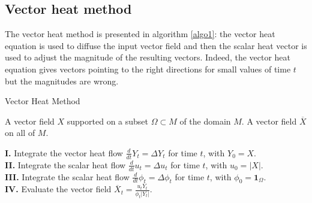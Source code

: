 \documentclass[sigconf]{acmart}
\begin{document}
\subsection{Vector heat method}
The vector heat method \cite{sharp_vector_2019} is presented in algorithm \ref{algo1}: the vector heat equation is used to diffuse the input vector field and then the scalar heat vector is used to adjust the magnitude of the resulting vectors. Indeed, the vector heat equation gives vectors pointing to the right directions for small values of time $t$ but the magnitudes are wrong. 

\begin{algorithm}
\caption{Vector Heat Method} \label{algo1}
\begin{algorithmic}
\Require A vector field $X$ supported on a subset $\Omega \subset M$ of the domain $M$.
\Ensure A vector field $\overline{X}$ on all of $M$.

\noindent \textbf{I.} Integrate the vector heat flow $\frac{d}{dt} Y_t = \Delta Y_t$ for time $t$, with $Y_0 = X$. \\

\textbf{II.} Integrate the scalar heat flow $\frac{d}{dt} u_t = \Delta u_t$ for time $t$, with $u_0 = |X|$. \\

\textbf{III.} Integrate the scalar heat flow $\frac{d}{dt} \phi_t = \Delta \phi_t$ for time $t$, with $\phi_0 = \mathbf{1}_{\Omega}$. \\

\textbf{IV.} Evaluate the vector field $\overline{X}_t = \frac{u_t Y_t}{\phi_t |Y_t|}$.
\end{algorithmic}
\end{algorithm}
\end{document}
